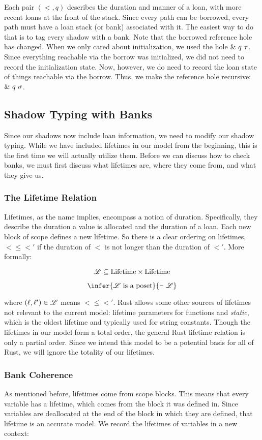 Each pair $(\lt, q)$ describes the duration and manner of a loan, 
with more recent loans at the front of the stack.
Since every path can be borrowed, every path must have a loan stack (or bank) associated with it.
The easiest way to do that is to tag every shadow with a bank.
Note that the borrowed reference hole has changed.
When we only cared about initialization, we used the hole $\&~{{q}~{\tau}}$.
Since everything reachable via the borrow was initialized, we did not need to record
the initialization state.
Now, however, we do need to record the loan state of things reachable via the borrow.
Thus, we make the reference hole recursive: $\&~{{q}~{\sigma}}$.

\subsection*{Shadow Typing with Banks}
Since our shadows now include loan information, we need to modify our shadow typing.
While we have included lifetimes in our model from the beginning, this is the first time
we will actually utilize them. Before we can discuss how to check banks, we must first
discuss what lifetimes are, where they come from, and what they give us.

\subsubsection*{The Lifetime Relation}
Lifetimes, as the name implies, encompass a notion of duration.
Specifically, they describe the duration a value is allocated and 
the duration of a loan. Each new block of scope defines a new lifetime.
So there is a clear ordering on lifetimes, $\lt \leq \lt'$ if the duration of $\lt$
is not longer than the duration of $\lt'$. More formally:

$$ \mathscr{L} \subseteq \textrm{Lifetime} \times \textrm{Lifetime} $$

$$ \infer{\ltr \ \textrm{is a poset}}{\vdash \ltr} $$

where $(\ell, \ell') \in \mathscr{L}$ means $\lt \leq \lt'$. Rust allows some other sources of lifetimes
not relevant to the current model: lifetime parameters for functions and \emph{static}, which
is the oldest lifetime and typically used for string constants. Though the lifetimes in our
model form a total order, the general Rust lifetime relation is only a partial order.
Since we intend this model to be a potential basis for all of Rust, we will ignore the
totality of our lifetimes.

\subsubsection*{Bank Coherence}
As mentioned before, lifetimes come from scope blocks.
This means that every variable has a lifetime, which comes from the block it was defined in.
Since variables are deallocated at the end of the block in which they are defined,
that lifetime is an accurate model. We record the lifetimes of variables in a new context:

